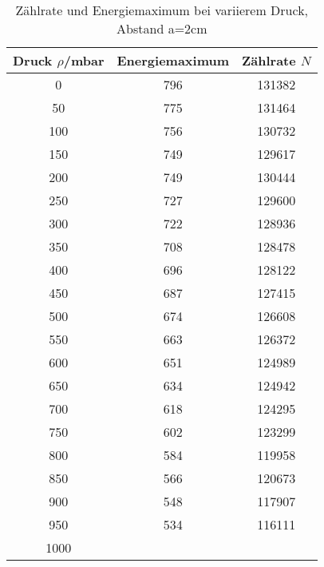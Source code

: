 \begin{table}[H]
  \centering
  \caption{Zählrate und Energiemaximum bei variierem Druck, Abstand a=2cm}
  \label{tab:tab1}
    \begin{tabular}{c c c}
    \toprule
    Druck $\rho$/\;mbar & Energiemaximum & Zählrate $N$\\
    \midrule
    0 & 796 &131382    \\
    50 & 775 &131464 \\
    100 &756 &130732 \\
    150 &749 &129617 \\
    200 &749 &130444 \\
    250 &727 &129600 \\
    300 &722 &128936 \\
    350 &708 &128478 \\
    400 &696 &128122 \\
    450 &687 &127415 \\
    500 &674 &126608 \\
    550 &663 &126372 \\
    600 &651 &124989 \\
    650 &634 &124942 \\
    700 &618 &124295 \\
    750 &602 &123299 \\
    800 &584 &119958 \\
    850 &566 &120673 \\
    900 &548 &117907 \\
    950 &534 &116111 \\
    1000 &   &        \\
    \bottomrule
    \end{tabular}
  \end{table}
